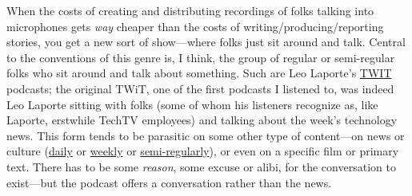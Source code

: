 \documentclass[
  12pt,
]{article}
\begin{document}
When the costs of creating and distributing recordings of folks talking
into microphones gets \emph{way} cheaper than the costs of
writing/producing/reporting stories, you get a new sort of show---where
folks just sit around and talk. Central to the conventions of this genre
is, I think, the group of regular or semi-regular folks who sit around
and talk about something. Such are Leo Laporte's
\href{http://www.twit.tv}{TWIT} podcasts; the original TWiT, one of the
first podcasts I listened to, was indeed Leo Laporte sitting with folks
(some of whom his listeners recognize as, like Laporte, erstwhile TechTV
employees) and talking about the week's technology news. This form tends
to be parasitic on some other type of content---on news or culture
(\href{http://www.tommerritt.com/category/shows/daily-tech-news-show/}{daily}
or
\href{http://www.slate.com/articles/podcasts/culturegabfest.html}{weekly}
or \href{http://digitalcampus.tv}{semi-regularly}), or even on a
specific film or primary text. There has to be some \emph{reason}, some
excuse or alibi, for the conversation to exist---but the podcast offers
a conversation rather than the news.
\end{document}
